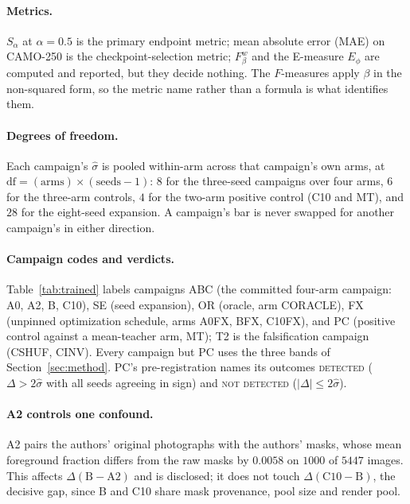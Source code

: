 \documentclass{article}
\begin{document}
\paragraph{Metrics.} $S_\alpha$ at $\alpha = 0.5$ is the primary endpoint metric; mean absolute
error (MAE) on CAMO-250 is the checkpoint-selection metric; $F_\beta^w$ and the E-measure $E_\phi$
are computed and reported, but they decide nothing.
The $F$-measures apply $\beta$ in the non-squared form, so the metric name rather than a formula is what identifies them.

\paragraph{Degrees of freedom.} Each campaign's $\hat{\sigma}$ is pooled within-arm across that
campaign's own arms, at $\mathrm{df} = (\text{arms}) \times (\text{seeds} - 1)$: $8$ for the
three-seed campaigns over four arms, $6$ for the three-arm controls, $4$ for the two-arm positive
control (C10 and MT), and $28$ for the eight-seed expansion. A campaign's bar is never swapped for another campaign's in either direction.

\paragraph{Campaign codes and verdicts.} Table~\ref{tab:trained} labels campaigns ABC (the committed
four-arm campaign: A0, A2, B, C10), SE (seed expansion), OR (oracle, arm CORACLE), FX (unpinned
optimization schedule, arms A0FX, BFX, C10FX), and PC (positive control against a mean-teacher arm,
MT); T2 is the falsification campaign (CSHUF, CINV). Every campaign but PC uses the three bands of
Section~\ref{sec:method}. PC's pre-registration names its outcomes \textsc{detected} ($\Delta > 2\hat{\sigma}$
with all seeds agreeing in sign) and \textsc{not detected} ($|\Delta| \le 2\hat{\sigma}$).

\paragraph{A2 controls one confound.} A2 pairs the authors' original photographs with the
authors' masks, whose mean foreground fraction differs from the raw masks by $0.0058$ on $1000$ of
$5447$ images. This affects $\Delta(\mathrm{B}-\mathrm{A2})$ and is disclosed; it does not touch
$\Delta(\mathrm{C10}-\mathrm{B})$, the decisive gap, since B and C10 share mask provenance, pool
size and render pool.
\end{document}
